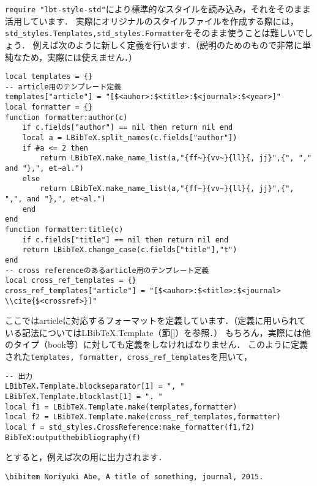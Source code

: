\documentclass[dvipdfmx,a4paper]{jsarticle}
\begin{document}
\verb|require "lbt-style-std"|により標準的なスタイルを読み込み，それをそのまま活用しています．
実際にオリジナルのスタイルファイルを作成する際には，\verb|std_styles.Templates,std_styles.Formatter|をそのまま使うことは難しいでしょう．
例えば次のように新しく定義を行います．（説明のためのもので非常に単純なため，実際には使えません．）
\begin{lstlisting}
local templates = {}
-- article用のテンプレート定義
templates["article"] = "[$<auhor>:$<title>:$<journal>:$<year>]"
local formatter = {}
function formatter:author(c)
	if c.fields["author"] == nil then return nil end
	local a = LBibTeX.split_names(c.fields["author"])
	if #a <= 2 then
		return LBibTeX.make_name_list(a,"{ff~}{vv~}{ll}{, jj}",{", "," and "},", et~al.")
	else
		return LBibTeX.make_name_list(a,"{ff~}{vv~}{ll}{, jj}",{", ",", and "},", et~al.")
	end
end
function formatter:title(c)
	if c.fields["title"] == nil then return nil end
	return LBibTeX.change_case(c.fields["title"],"t")
end
-- cross referenceのあるarticle用のテンプレート定義
local cross_ref_templates = {}
cross_ref_templates["article"] = "[$<auhor>:$<title>:$<journal> \\cite{$<crossref>}]"
\end{lstlisting}
ここではarticleに対応するフォーマットを定義しています．（定義に用いられている記法についてはLBibTeX.Template（節\ref{}）を参照．）
もちろん，実際には他のタイプ（book等）に対しても定義をしなければなりません．
このように定義された\verb|templates, formatter, cross_ref_templates|を用いて，
\begin{lstlisting}
-- 出力
LBibTeX.Template.blockseparator[1] = ", "
LBibTeX.Template.blocklast[1] = ". "
local f1 = LBibTeX.Template.make(templates,formatter)
local f2 = LBibTeX.Template.make(cross_ref_templates,formatter)
local f = std_styles.CrossReference:make_formatter(f1,f2)
BibTeX:outputthebibliography(f)
\end{lstlisting}
とすると，例えば次の用に出力されます．
\begin{lstlisting}[language={[latex]TeX}]
\bibitem Noriyuki Abe, A title of something, journal, 2015.
\end{lstlisting}
\end{document}
